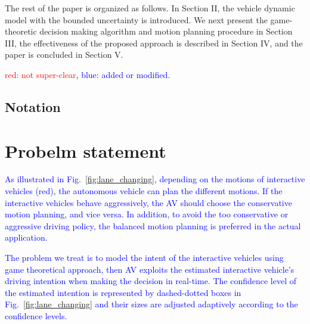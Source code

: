\documentclass[10pt,journal]{IEEEtran}
\begin{document}
	The rest of the paper is organized as follows. In Section II, the vehicle dynamic model with the bounded uncertainty is introduced. We next present the game-theoretic decision making algorithm and motion planning procedure in Section III, the effectiveness of the proposed approach is described in Section IV, and the paper is concluded in Section V.
	
	\textcolor{red}{red: not super-clear}, \textcolor{blue}{blue: added or modified.}
	


	\subsection{Notation}




	\section{Probelm statement}
	\label{sec:problem_statement}
	
	\textcolor{blue}{As illustrated in Fig.~\ref{fig:lane_changing}, depending on the motions of interactive vehicles (red), the autonomous vehicle can plan the different motions. If the interactive vehicles behave aggressively, the AV should choose the conservative motion planning, and vice versa. In addition, to avoid the too conservative or aggressive driving policy, the balanced motion planning is preferred in the actual application.
	}
	
	\textcolor{blue}{The problem we treat is to model the intent of the interactive vehicles using game theoretical approach, then AV exploits the estimated interactive vehicle's driving intention when making the decision in real-time. The confidence level of the estimated intention is represented by dashed-dotted boxes in Fig.~\ref{fig:lane_changing} and their sizes are adjusted adaptively according to the confidence levels.}
\end{document}
